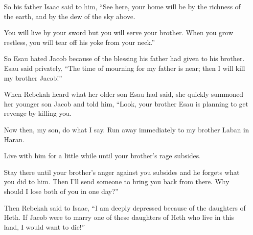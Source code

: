 \begin{scripture}
 So his father Isaac said to him, ``See here, your home will be by the richness of the earth, and by the dew of the sky above.
\everypar{}

 You will live by your sword but you will serve your brother. When you grow restless, you will tear off his yoke from your neck.''
\everypar{}

 So Esau hated Jacob because of the blessing his father had given to his brother. Esau said privately, ``The time of mourning for my father is near; then I will kill my brother Jacob!''
\everypar{}

 When Rebekah heard what her older son Esau had said, she quickly summoned her younger son Jacob and told him, ``Look, your brother Esau is planning to get revenge by killing you.
 Now then, my son, do what I say. Run away immediately to my brother Laban in Haran.
 Live with him for a little while until your brother's rage subsides.
 Stay there until your brother's anger against you subsides and he forgets what you did to him. Then I'll send someone to bring you back from there. Why should I lose both of you in one day?''
\everypar{}

 Then Rebekah said to Isaac, ``I am deeply depressed because of the daughters of Heth. If Jacob were to marry one of these daughters of Heth who live in this land, I would want to die!''


\end{scripture}
